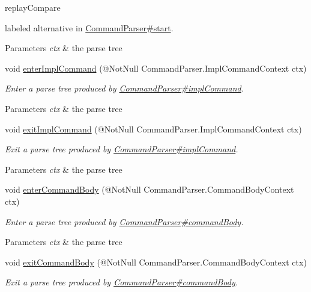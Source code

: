 \begin{DoxyCompactItemize}
\begin{DoxyCompactList}
\begin{DoxyCode}
replayCompare 
\end{DoxyCode}
 labeled alternative in \hyperlink{}{Command\+Parser\#start}. 
\begin{DoxyParams}{Parameters}
{\em ctx} & the parse tree\\
\hline
\end{DoxyParams}
 \end{DoxyCompactList}\item 
void \hyperlink{classedu_1_1udel_1_1cis_1_1vsl_1_1civl_1_1run_1_1common_1_1CommandBaseListener_a8d72f0f5ba9ab170525c359ffcced441}{enter\+Impl\+Command} (@Not\+Null Command\+Parser.\+Impl\+Command\+Context ctx)
\begin{DoxyCompactList}\small\item\em Enter a parse tree produced by \hyperlink{}{Command\+Parser\#impl\+Command}.


\begin{DoxyParams}{Parameters}
{\em ctx} & the parse tree\\
\hline
\end{DoxyParams}
 \end{DoxyCompactList}\item 
void \hyperlink{classedu_1_1udel_1_1cis_1_1vsl_1_1civl_1_1run_1_1common_1_1CommandBaseListener_ab75c75715b9dd9868cdbcefef4a70c31}{exit\+Impl\+Command} (@Not\+Null Command\+Parser.\+Impl\+Command\+Context ctx)
\begin{DoxyCompactList}\small\item\em Exit a parse tree produced by \hyperlink{}{Command\+Parser\#impl\+Command}.


\begin{DoxyParams}{Parameters}
{\em ctx} & the parse tree\\
\hline
\end{DoxyParams}
 \end{DoxyCompactList}\item 
void \hyperlink{classedu_1_1udel_1_1cis_1_1vsl_1_1civl_1_1run_1_1common_1_1CommandBaseListener_ad21c7cc2f86c4169fd1a09388371b420}{enter\+Command\+Body} (@Not\+Null Command\+Parser.\+Command\+Body\+Context ctx)
\begin{DoxyCompactList}\small\item\em Enter a parse tree produced by \hyperlink{}{Command\+Parser\#command\+Body}.


\begin{DoxyParams}{Parameters}
{\em ctx} & the parse tree\\
\hline
\end{DoxyParams}
 \end{DoxyCompactList}\item 
void \hyperlink{classedu_1_1udel_1_1cis_1_1vsl_1_1civl_1_1run_1_1common_1_1CommandBaseListener_a516243ef6fe795b3b9350f48b54ce931}{exit\+Command\+Body} (@Not\+Null Command\+Parser.\+Command\+Body\+Context ctx)
\begin{DoxyCompactList}\small\item\em Exit a parse tree produced by \hyperlink{}{Command\+Parser\#command\+Body}.



\end{DoxyCompactList}
\end{DoxyCompactItemize}
